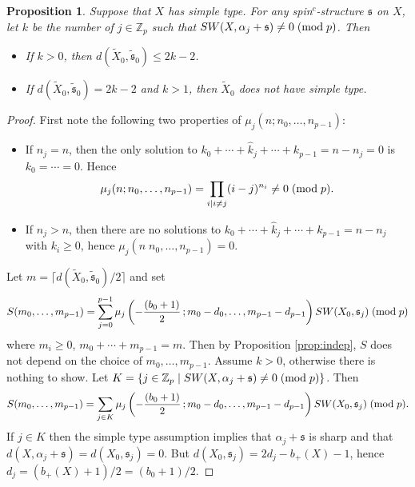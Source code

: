 \documentclass{amsart}
\newtheorem{proposition}[theorem]{Proposition}
\theoremstyle{definition}
\theoremstyle{remark}
\numberwithin{equation}{section}
\begin{document}
\begin{proposition}\label{prop:dimbound}
Suppose that $X$ has simple type. For any spin$^c$-structure $\mathfrak{s}$ on $X$, let $k$ be the number of $j \in \mathbb{Z}_p$ such that $SW(X , \alpha_j + \mathfrak{s}) \neq 0 \; ({\rm mod} \; p)$. Then
\begin{itemize}
\item[(1)]{If $k > 0$, then $d(\widetilde{X}_0 , \widetilde{\mathfrak{s}}_0) \le 2k-2$.}
\item[(2)]{If $d(\widetilde{X}_0 , \widetilde{\mathfrak{s}}_0) = 2k-2$ and $k > 1$, then $\widetilde{X}_0$ does not have simple type.}
\end{itemize}

\end{proposition}
\begin{proof}
First note the following two properties of $\mu_j( n ; n_0 , \dots , n_{p-1})$:
\begin{itemize}
\item[(a)]{If $n_j = n$, then the only solution to $k_0 + \cdots + \widehat{k}_j + \cdots + k_{p-1} = n-n_j = 0$ is $k_0 = \cdots = 0$. Hence
\[
\mu_j( n ; n_0 , \dots , n_{p-1}) = \prod_{i | i \neq j } (i-j)^{n_i} \neq 0 \; ({\rm mod} \; p).
\]
}
\item[(b)]{If $n_j > n$, then there are no solutions to $k_0 + \cdots + \widehat{k}_j + \cdots + k_{p-1} = n-n_j$ with $k_i \ge 0$, hence $\mu_j( n \; n_0 , \dots , n_{p-1}) = 0$.}
\end{itemize}

Let $m = \lceil d(\widetilde{X}_0 , \widetilde{\mathfrak{s}}_0)/2 \rceil$ and set
\[
S(m_0, \dots , m_{p-1}) = \sum_{j=0}^{p-1} \mu_j\left( -\frac{ (b_0+1) }{2} \, ; m_0-d_0 , \dots , m_{p-1} - d_{p-1} \right) SW(X_0 , \mathfrak{s}_j) \; ({\rm mod} \; p)
\]
where $m_i \ge 0$, $m_0 + \cdots + m_{p-1} = m$. Then by Proposition \ref{prop:indep}, $S$ does not depend on the choice of $m_0, \dots , m_{p-1}$. Assume $k > 0$, otherwise there is nothing to show. Let $K = \{ j \in \mathbb{Z}_p \; | \; SW(X , \alpha_j + \mathfrak{s}) \neq 0 \; ({\rm mod} \; p) \}$. Then
\[
S(m_0, \dots , m_{p-1}) = \sum_{j \in K} \mu_j\left( -\frac{ (b_0+1) }{2} \, ; m_0-d_0 , \dots , m_{p-1} - d_{p-1} \right) SW(X_0 , \mathfrak{s}_j) \; ({\rm mod} \; p).
\]
If $j \in K$ then the simple type assumption implies that $\alpha_j + \mathfrak{s}$ is sharp and that $d(X , \alpha_j + \mathfrak{s}) = d(X_0 , \mathfrak{s}_j) = 0$. But $d(X_0 , \mathfrak{s}_j) = 2d_j - b_+(X) - 1$, hence $d_j = (b_+(X)+1)/2 = (b_0 + 1)/2$. 


\end{proof}
\end{document}
